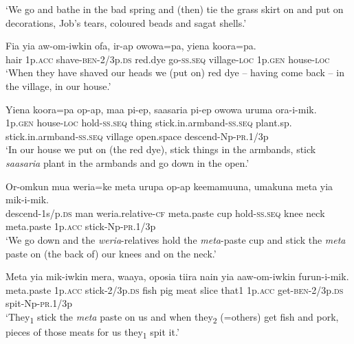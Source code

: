 \glt ‘We go and bathe in the bad spring and (then) tie the grass skirt on and put on decorations, Job’s tears, coloured beads and sagat shells.’ \\
\z


\ea\label{ex:a:x11}
\gll  Fia  yia  aw-om-iwkin  ofa,  ir-ap  owowa=pa,              yiena  koora=pa. \\
hair  1p.\textsc{acc}  shave-\textsc{ben}-2/3p.\textsc{ds}  red.dye  go-\textsc{ss.seq}  village-\textsc{loc} 1p.\textsc{gen}  house-\textsc{loc} \\


\glt ‘When they have shaved our heads we (put on) red dye – having come back – in the village, in our house.’ \\
\z


\ea\label{ex:a:x12}
\gll  Yiena  koora=pa  op-ap,  maa  pi-ep,                      saasaria  pi-ep  owowa  uruma  ora-i-mik. \\
1p.\textsc{gen}  house-\textsc{loc}  hold-\textsc{ss.seq}  thing  stick.in.armband-\textsc{ss.seq}  plant.sp.  stick.in.armband-\textsc{ss.seq}  village  open.space  descend-Np-\textsc{pr}.1/3p \\


\glt ‘In our house we put on (the red dye), stick things in the armbands, stick \textit{saasaria} plant in the armbands and go down in the open.’ \\
\z


\ea\label{ex:a:x13}
\gll  Or-omkun  mua  weria=ke  meta  urupa  op-ap                      keemamuuna,  umakuna  meta  yia  mik-i-mik. \\
descend-1s/p.\textsc{ds}  man  weria.relative-\textsc{cf}  meta.paste  cup  hold-\textsc{ss.seq}  knee  neck  meta.paste  1p.\textsc{acc}  stick-Np-\textsc{pr}.1/3p \\


\glt ‘We go down and the \textit{weria}{}-relatives hold the \textit{meta}{}-paste cup and stick the \textit{meta} paste on (the back of) our knees and on the neck.’ \\
\z


\ea\label{ex:a:x14}
\gll  Meta  yia  mik-iwkin  mera,  waaya,  oposia  tiira  nain    yia  aaw-om-iwkin  furun-i-mik. \\
meta.paste  1p.\textsc{acc}  stick-2/3p.\textsc{ds}  fish  pig  meat  slice  that1  1p.\textsc{acc}  get-\textsc{ben}-2/3p.\textsc{ds}  spit-Np-\textsc{pr}.1/3p \\


\glt ‘They\textsubscript{1} stick the \textit{meta} paste on us and when they\textsubscript{2} (=others) get fish and pork, pieces of those meats for us they\textsubscript{1} spit it.’ \\
\z


